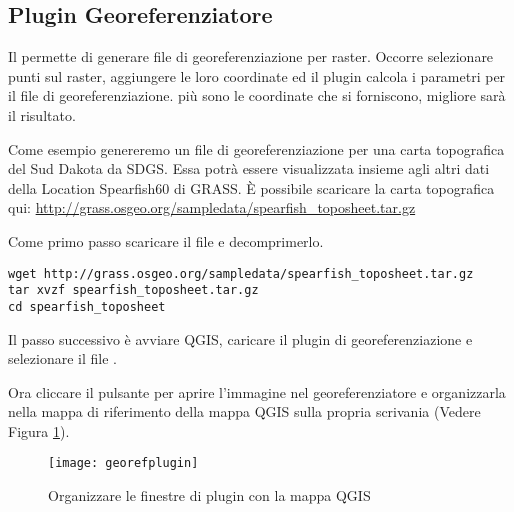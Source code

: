 
\subsection{Plugin Georeferenziatore}


Il  permette di generare file di georeferenziazione per raster. Occorre selezionare punti sul raster, aggiungere le loro coordinate ed il plugin calcola i parametri per il file di georeferenziazione. più sono le coordinate che si forniscono, migliore sarà il risultato.

Come esempio genereremo un file di georeferenziazione per una carta topografica del Sud Dakota da SDGS. Essa potrà essere visualizzata insieme agli altri dati della Location Spearfish60 di GRASS. È possibile scaricare la carta topografica qui: \url{http://grass.osgeo.org/sampledata/spearfish\_toposheet.tar.gz}

Come primo passo scaricare il file e decomprimerlo.

\begin{verbatim}
wget http://grass.osgeo.org/sampledata/spearfish_toposheet.tar.gz
tar xvzf spearfish_toposheet.tar.gz
cd spearfish_toposheet
\end{verbatim}

Il passo successivo è avviare QGIS, caricare il plugin di georeferenziazione e selezionare il file .


Ora cliccare il pulsante  per aprire l'immagine nel georeferenziatore e organizzarla nella mappa di riferimento della mappa QGIS sulla propria scrivania (Vedere Figura \ref{fig:georefplugin}).

\begin{figure}[ht]
\begin{center}
  \caption{Organizzare le finestre di plugin con la mappa QGIS \nixcaption}\label{fig:georefplugin}\smallskip
  \texttt{[image: georefplugin]}
\end{center}
\end{figure}

